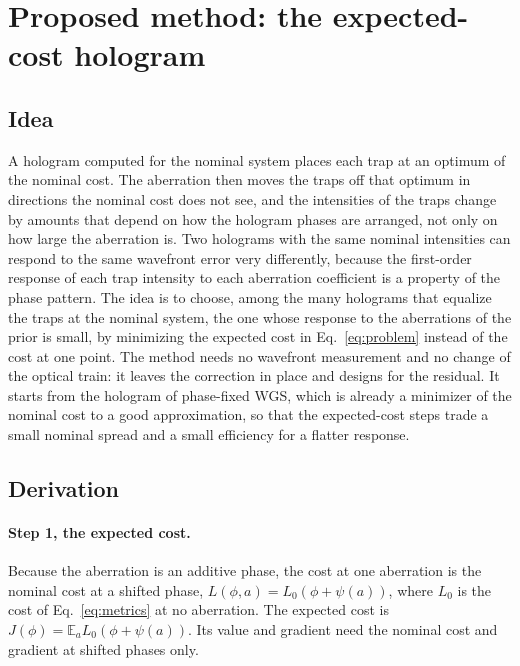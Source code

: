 \section{Proposed method: the expected-cost hologram}\label{sec:proposed-method}

\subsection{Idea}

A hologram computed for the nominal system places each trap at an optimum of the nominal cost. The aberration then moves the traps off that optimum in directions the nominal cost does not see, and the intensities of the traps change by amounts that depend on how the hologram
phases are arranged, not only on how large the aberration is. Two holograms with the same nominal intensities can respond to the same wavefront error very differently, because the first-order response of each trap intensity to each aberration coefficient is a
property of the phase pattern. The idea is to choose, among the many holograms that equalize the traps at the nominal system, the one whose response to the aberrations of the prior is small, by minimizing the expected cost in Eq.~\eqref{eq:problem} instead of the cost at one point.
The method needs no wavefront measurement and no change of the optical train: it leaves the correction in place and designs for the residual. It starts from the hologram of phase-fixed WGS, which is already a minimizer of the nominal cost to a good approximation, so that the
expected-cost steps trade a small nominal spread and a small efficiency for a flatter response.

\subsection{Derivation}

\paragraph{Step 1, the expected cost.} Because the aberration is an additive phase, the cost at one aberration is the nominal cost at a shifted phase, $L(\phi,a)=L_0(\phi+\psi(a))$, where $L_0$ is the cost of Eq.~\eqref{eq:metrics} at no aberration. The expected cost is
$J(\phi)=\mathbb E_aL_0(\phi+\psi(a))$. Its value and gradient need the nominal cost and gradient at shifted phases only.


